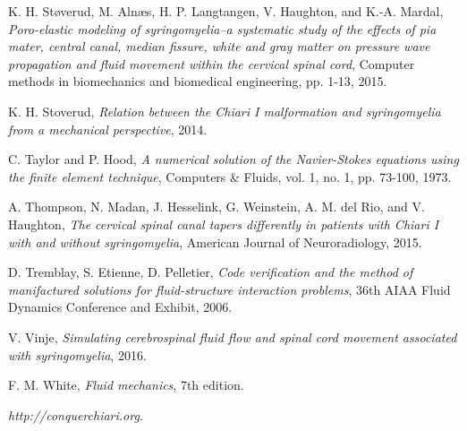 \documentclass[a4paper,11pt,oneside]{book}
\begin{document}
\begin{thebibliography}{100}
 K. H. Støverud, M. Alnæs, H. P. Langtangen, V. Haughton, and K.-A. Mardal, \emph{Poro-elastic modeling of syringomyelia–a systematic study of the effects of pia mater, central canal, median fissure, white and gray matter on pressure wave propagation and fluid movement within the cervical spinal cord}, Computer methods in biomechanics and biomedical engineering, pp. 1-13, 2015.

 K. H. Stoverud, \emph{Relation between the Chiari I malformation and syringomyelia from a mechanical perspective}, 2014.

 C. Taylor and P. Hood, \emph{A numerical solution of the Navier-Stokes equations using the finite element technique}, Computers \& Fluids, vol. 1, no. 1, pp. 73-100, 1973.

 A. Thompson, N. Madan, J. Hesselink, G. Weinstein, A. M. del Rio, and V. Haughton, \emph{The cervical spinal canal tapers differently in patients with Chiari I with and without syringomyelia}, American Journal of Neuroradiology, 2015.

 D. Tremblay, S. Etienne, D. Pelletier, \emph{Code verification and the method of manifactured solutions for fluid-structure interaction problems}, 36th AIAA Fluid Dynamics Conference and Exhibit, 2006.

 V. Vinje, \emph{Simulating cerebrospinal fluid flow and spinal cord movement associated with syringomyelia}, 2016.

 F. M. White, \emph{Fluid mechanics}, 7th edition.

 \emph{http://conquerchiari.org}.


\end{thebibliography}
\end{document}
